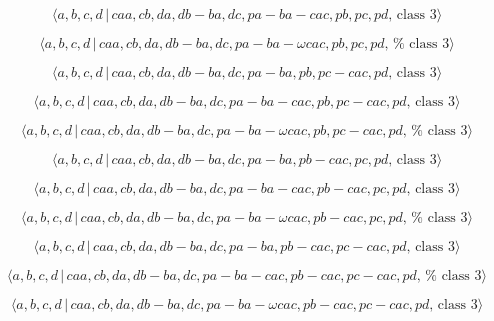 \documentclass[10pt]{article}
\begin{document}
\begin{equation}
\langle a,b,c,d\,|\,caa,cb,da,db-ba,dc,pa-ba-cac,pb,pc,pd,\,\text{class }%
3\rangle  \tag{7.4125}
\end{equation}

\begin{equation}
\langle a,b,c,d\,|\,caa,cb,da,db-ba,dc,pa-ba-\omega cac,pb,pc,pd,\,\text{%
class }3\rangle  \tag{7.4126}
\end{equation}

\begin{equation}
\langle a,b,c,d\,|\,caa,cb,da,db-ba,dc,pa-ba,pb,pc-cac,pd,\,\text{class }%
3\rangle  \tag{7.4127}
\end{equation}

\begin{equation}
\langle a,b,c,d\,|\,caa,cb,da,db-ba,dc,pa-ba-cac,pb,pc-cac,pd,\,\text{class }%
3\rangle  \tag{7.4128}
\end{equation}

\begin{equation}
\langle a,b,c,d\,|\,caa,cb,da,db-ba,dc,pa-ba-\omega cac,pb,pc-cac,pd,\,\text{%
class }3\rangle  \tag{7.4129}
\end{equation}

\begin{equation}
\langle a,b,c,d\,|\,caa,cb,da,db-ba,dc,pa-ba,pb-cac,pc,pd,\,\text{class }%
3\rangle  \tag{7.4130}
\end{equation}

\begin{equation}
\langle a,b,c,d\,|\,caa,cb,da,db-ba,dc,pa-ba-cac,pb-cac,pc,pd,\,\text{class }%
3\rangle  \tag{7.4131}
\end{equation}

\begin{equation}
\langle a,b,c,d\,|\,caa,cb,da,db-ba,dc,pa-ba-\omega cac,pb-cac,pc,pd,\,\text{%
class }3\rangle  \tag{7.4132}
\end{equation}

\begin{equation}
\langle a,b,c,d\,|\,caa,cb,da,db-ba,dc,pa-ba,pb-cac,pc-cac,pd,\,\text{class }%
3\rangle  \tag{7.4133}
\end{equation}

\begin{equation}
\langle a,b,c,d\,|\,caa,cb,da,db-ba,dc,pa-ba-cac,pb-cac,pc-cac,pd,\,\text{%
class }3\rangle  \tag{7.4134}
\end{equation}

\begin{equation}
\langle a,b,c,d\,|\,caa,cb,da,db-ba,dc,pa-ba-\omega cac,pb-cac,pc-cac,pd,\,%
\text{class }3\rangle  \tag{7.4135}
\end{equation}
\end{document}
